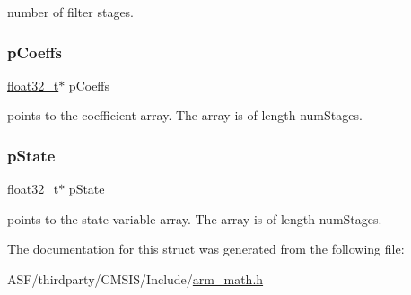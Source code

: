 number of filter stages. \mbox{\label{structarm__fir__lattice__instance__f32_aacbb8dd8eeba4b21fc2bb40076405ee3}} 
\subsubsection{\texorpdfstring{pCoeffs}{pCoeffs}}
{\footnotesize\ttfamily \mbox{\hyperlink{arm__math_8h_a4611b605e45ab401f02cab15c5e38715}{float32\+\_\+t}}$\ast$ p\+Coeffs}

points to the coefficient array. The array is of length num\+Stages. \mbox{\label{structarm__fir__lattice__instance__f32_a335c87e6fdc4b96601d95a5de8b9c463}} 
\subsubsection{\texorpdfstring{pState}{pState}}
{\footnotesize\ttfamily \mbox{\hyperlink{arm__math_8h_a4611b605e45ab401f02cab15c5e38715}{float32\+\_\+t}}$\ast$ p\+State}

points to the state variable array. The array is of length num\+Stages. 

The documentation for this struct was generated from the following file\+:\begin{DoxyCompactItemize}
\item 
A\+S\+F/thirdparty/\+C\+M\+S\+I\+S/\+Include/\mbox{\hyperlink{arm__math_8h}{arm\+\_\+math.\+h}}\end{DoxyCompactItemize}
